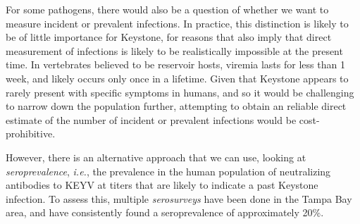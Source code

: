 \documentclass[12pt]{article}
\newcommand{\ie}{\textit{i.e.}}
\newcommand{\cjh}{\textcolor{blue}{cjh}}
\newcommand{\msg}[3]{(#1 $\rightarrow$ #2: #3)}
\newcommand{\mcc}[1]{\msg\cjh\cjh{#1}}
\begin{document}
        For some pathogens, there would also be a question of whether we want to measure incident or prevalent infections. In practice, this distinction is likely to be of little importance for Keystone, for reasons that also imply that direct measurement of infections is likely to be realistically impossible at the present time. In vertebrates believed to be reservoir hosts, viremia lasts for less than 1 week, and likely occurs only once in a lifetime\cite{watts1988maintenance,watts1979experimental}. Given that Keystone appears to rarely present with specific symptoms in humans, and so it would be challenging to narrow down the population further, attempting to obtain an reliable direct estimate of the number of incident or prevalent infections would be cost-prohibitive.
        

        However, there is an alternative approach that we can use, looking at \textit{seroprevalence}, \ie, the prevalence in the human population of neutralizing antibodies to KEYV at titers that are likely to indicate a past Keystone infection. To assess this, multiple \textit{serosurveys} have been done in the Tampa Bay area, and have consistently found a seroprevalence of approximately 20\%\cite{parkin1972review}.%
\end{document}
